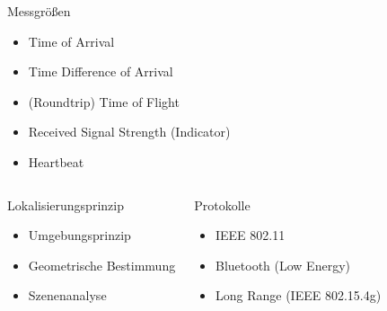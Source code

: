 \documentclass[18pt]{beamer}
\begin{document}
\begin{frame}
	\begin{block}{Messgrößen}
		\begin{itemize}
			\item Time of Arrival
			\item Time Difference of Arrival
			\item (Roundtrip) Time of Flight
			\item Received Signal Strength (Indicator)
			\item Heartbeat
		\end{itemize}
	\end{block}

	\begin{columns}
				\begin{block}{Lokalisierungsprinzip}
					\begin{itemize}
						\item Umgebungsprinzip
						\item Geometrische Bestimmung
						\item Szenenanalyse
					\end{itemize}
				\end{block}

			\begin{block}{Protokolle}
				\begin{itemize}
					\item IEEE 802.11
					\item Bluetooth (Low Energy)
					\item Long Range (IEEE 802.15.4g)
				\end{itemize}
			\end{block}
	\end{columns}
\end{frame}
\end{document}

